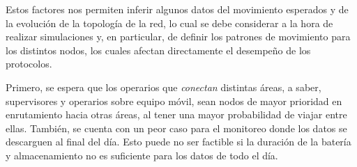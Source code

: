 Estos factores nos permiten inferir algunos datos del movimiento esperados y de la evolución de la topología de la red, lo cual se debe considerar a la hora de realizar simulaciones y, en particular, de definir los patrones de movimiento para los distintos nodos, los cuales afectan directamente el desempeño de los protocolos.

Primero, se espera que los operarios que \emph{conectan} distintas áreas, a saber, supervisores y operarios sobre equipo móvil, sean nodos de mayor prioridad en enrutamiento hacia otras áreas, al tener una mayor probabilidad de viajar entre ellas.
También, se cuenta con un peor caso para el monitoreo donde los datos se descarguen al final del día. Esto puede no ser factible si la duración de la batería y almacenamiento no es suficiente para los datos de todo el día.
